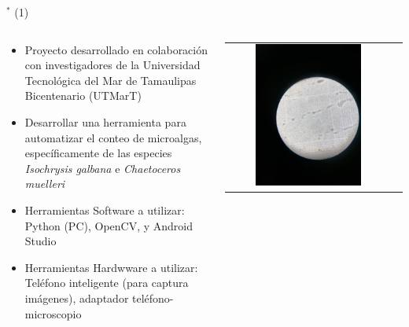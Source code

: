 
\begin{frame}{$^*$ (1)}
\begin{columns}
\begin{column}{0.6\textwidth}
	\begin{itemize}  %
        \item Proyecto desarrollado  en colaboración con investigadores de la Universidad Tecnológica del Mar de Tamaulipas Bicentenario (UTMarT)
		\item Desarrollar una herramienta para automatizar el conteo de microalgas, específicamente de las especies \textit{Isochrysis galbana} e \textit{Chaetoceros muelleri}
        \item Herramientas Software a utilizar: Python (PC), OpenCV, y Android Studio
        \item Herramientas Hardwware a utilizar: Teléfono inteligente (para captura imágenes), adaptador teléfono-microscopio
	\end{itemize}
\end{column}
\begin{column}{0.4\textwidth}  
\begin{center}
     \begin{tabular}{cc}
         \includegraphics[width=0.68\textwidth]{2022_ConteoMicroAlgas/figs/MicroAlgas01}\\         
      \end{tabular}
\end{center}
\end{column} 
\end{columns} 



\end{frame}

